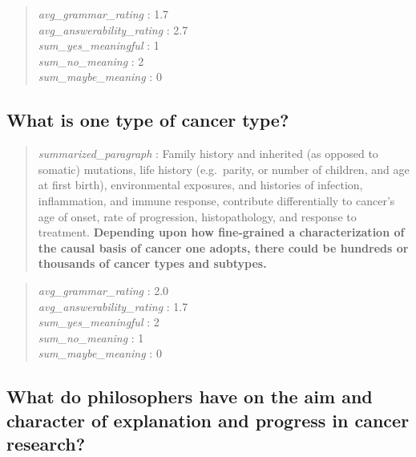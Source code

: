 \begin{quote}
\emph{avg\_grammar\_rating} : 1.7\\
\emph{avg\_answerability\_rating} : 2.7\\
\emph{sum\_yes\_meaningful} : 1\\
\emph{sum\_no\_meaning} : 2\\
\emph{sum\_maybe\_meaning} : 0
\end{quote}

\hypertarget{what-is-one-type-of-cancer-type}{%
\subsection{What is one type of cancer
type?}\label{what-is-one-type-of-cancer-type}}

\begin{quote}
\emph{summarized\_paragraph} : Family history and inherited (as opposed
to somatic) mutations, life history (e.g.~parity, or number of children,
and age at first birth), environmental exposures, and histories of
infection, inflammation, and immune response, contribute differentially
to cancer's age of onset, rate of progression, histopathology, and
response to treatment. \textbf{Depending upon how fine-grained a
characterization of the causal basis of cancer one adopts, there could
be hundreds or thousands of cancer types and subtypes.}
\end{quote}

\begin{quote}
\emph{avg\_grammar\_rating} : 2.0\\
\emph{avg\_answerability\_rating} : 1.7\\
\emph{sum\_yes\_meaningful} : 2\\
\emph{sum\_no\_meaning} : 1\\
\emph{sum\_maybe\_meaning} : 0
\end{quote}

\hypertarget{what-do-philosophers-have-on-the-aim-and-character-of-explanation-and-progress-in-cancer-research}{%
\subsection{What do philosophers have on the aim and character of
explanation and progress in cancer
research?}\label{what-do-philosophers-have-on-the-aim-and-character-of-explanation-and-progress-in-cancer-research}}


